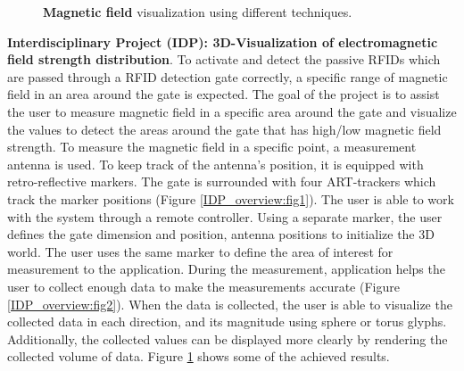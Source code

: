 \documentclass[]{report}
\begin{document}
\begin{figure}[!ht]
	\hfill
	\hfill
	\hfill
	\caption[Factory ray-tracing]{\textbf{Magnetic field} visualization using different techniques.}
	\label{fig:IDP_results}
\end{figure}
 
 \textbf{Interdisciplinary Project (IDP): 3D-Visualization of electromagnetic field strength distribution}. To activate and detect the passive RFIDs which are passed through a RFID detection gate correctly, a specific range of magnetic field in an area around the gate is expected. The goal of the project is to assist the user to measure magnetic field in a specific area around the gate and visualize the values to detect the areas around the gate that has high/low magnetic field strength. To measure the magnetic field in a specific point, a measurement antenna is used. To keep track of the antenna's position, it is equipped with retro-reflective markers. The gate is surrounded with four ART-trackers which track the marker positions (Figure \ref{IDP_overview:fig1}). The user is able to work with the system through a remote controller. Using a separate marker, the user defines the gate dimension and position, antenna positions to initialize the 3D world. The user uses the same marker to define the area of interest for measurement to the application. During the measurement, application helps the user to collect enough data to make the measurements accurate (Figure \ref{IDP_overview:fig2}). When the data is collected, the user is able to visualize the collected data in each direction, and its magnitude using sphere or torus glyphs. Additionally, the collected values can be displayed more clearly by rendering the collected volume of data. Figure \ref{fig:IDP_results} shows some of the achieved results.
 
\end{document}

